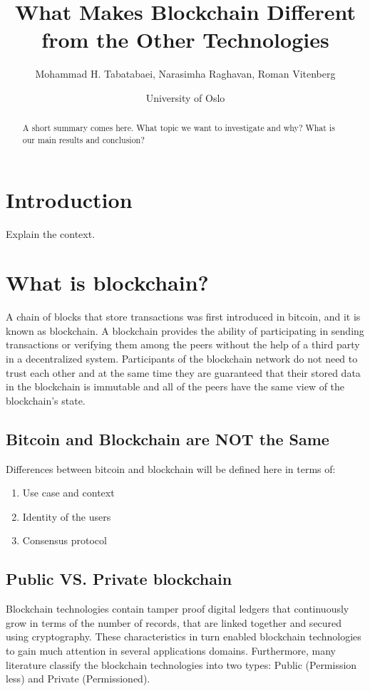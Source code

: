 \documentclass[a4paper]{article}
\title{What Makes Blockchain Different from the Other Technologies}
\author{Mohammad H. Tabatabaei, Narasimha Raghavan, Roman Vitenberg}
\date{University of Oslo}
\begin{document}
\maketitle

\begin{abstract}
A short summary comes here. What topic we want to investigate and why? What is our main results and conclusion?
\end{abstract}

\section{Introduction}
\label{sec:introduction}

Explain the context.

\section{What is blockchain?}
\label{sec:wib}

A chain of blocks that store transactions was first introduced in bitcoin, and it is known as blockchain. A blockchain provides the ability of participating in sending transactions or verifying them among the peers without the help of a third party in a decentralized system. Participants of the blockchain network do not need to trust each other and at the same time they are guaranteed that their stored data in the blockchain is immutable and all of the peers have the same view of the blockchain's state. 

\subsection{Bitcoin and Blockchain are NOT the Same}
\label{sec:bitcoinandblockchain}

Differences between bitcoin and blockchain will be defined here in terms of:
\begin{enumerate}
\item Use case and context
\item Identity of the users
\item Consensus protocol 
\end{enumerate}

\subsection{Public VS. Private blockchain}
\label{sec:publicvsprivate}

Blockchain technologies contain tamper proof digital ledgers that continuously grow in terms of the number of records, that are linked together and secured using cryptography. These characteristics in turn enabled blockchain technologies to  gain much attention in several applications domains. Furthermore, many literature classify the blockchain technologies into two types: Public (Permission less) and Private (Permissioned). 
\end{document}
